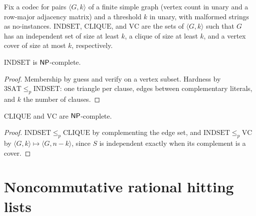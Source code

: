 \begin{definition}
  \label{def:polytime-graph-problems}
  Fix a codec for pairs $\langle G, k \rangle$ of a finite simple graph
  (vertex count in unary and a row-major adjacency matrix) and a threshold $k$
  in unary, with malformed strings as no-instances.
  $\mathrm{INDSET}$, $\mathrm{CLIQUE}$, and $\mathrm{VC}$ are the sets of
  $\langle G, k \rangle$ such that $G$ has an independent set of size at least
  $k$, a clique of size at least $k$, and a vertex cover of size at most $k$,
  respectively.
\end{definition}

\begin{theorem}
  \label{thm:polytime-indset-complete}
  $\mathrm{INDSET}$ is $\mathsf{NP}$-complete.
\end{theorem}
\begin{proof}
  Membership by guess and verify on a vertex subset. Hardness by
  $3\mathrm{SAT} \le_p \mathrm{INDSET}$: one triangle per clause, edges between
  complementary literals, and $k$ the number of clauses.
\end{proof}

\begin{theorem}
  \label{thm:polytime-clique-vc-complete}
  $\mathrm{CLIQUE}$ and $\mathrm{VC}$ are $\mathsf{NP}$-complete.
\end{theorem}
\begin{proof}
  $\mathrm{INDSET} \le_p \mathrm{CLIQUE}$ by complementing the edge set, and
  $\mathrm{INDSET} \le_p \mathrm{VC}$ by $\langle G, k \rangle \mapsto
  \langle G, n - k \rangle$, since $S$ is independent exactly when its
  complement is a cover.
\end{proof}

\section{Noncommutative rational hitting lists}

